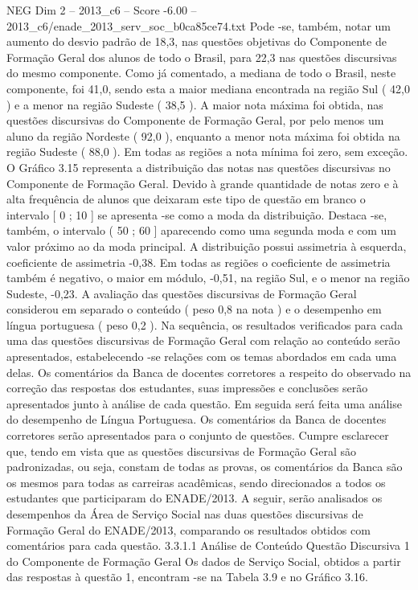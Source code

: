 \begin{textsample}{NEG Dim 2 – 2013\_c6 – Score -6.00 – 2013\_c6/enade\_2013\_serv\_soc\_b0ca85ce74.txt}
Pode -se, também, notar um aumento do desvio padrão de 18,3, nas questões objetivas do Componente de Formação Geral dos alunos de todo o Brasil, para 22,3 nas questões discursivas do mesmo componente.
Como já comentado, a mediana de todo o Brasil, neste componente, foi 41,0, sendo esta a maior mediana encontrada na região Sul ( 42,0 ) e a menor na região Sudeste ( 38,5 ).
A maior nota máxima foi obtida, nas questões discursivas do Componente de Formação Geral, por pelo menos um aluno da região Nordeste ( 92,0 ), enquanto a menor nota máxima foi obtida na região Sudeste ( 88,0 ).
Em todas as regiões a nota mínima foi zero, sem exceção.
O Gráfico 3.15 representa a distribuição das notas nas questões discursivas no Componente de Formação Geral.
Devido à grande quantidade de notas zero e à alta frequência de alunos que deixaram este tipo de questão em branco o intervalo [ 0 ; 10 ] se apresenta -se como a moda da distribuição.
Destaca -se, também, o intervalo ( 50 ; 60 ] aparecendo como uma segunda moda e com um valor próximo ao da moda principal.
A distribuição possui assimetria à esquerda, coeficiente de assimetria -0,38.
Em todas as regiões o coeficiente de assimetria também é negativo, o maior em módulo, -0,51, na região Sul, e o menor na região Sudeste, -0,23.
A avaliação das questões discursivas de Formação Geral considerou em separado o conteúdo ( peso 0,8 na nota ) e o desempenho em língua portuguesa ( peso 0,2 ).
Na sequência, os resultados verificados para cada uma das questões discursivas de Formação Geral com relação ao conteúdo serão apresentados, estabelecendo -se relações com os temas abordados em cada uma delas.
Os comentários da Banca de docentes corretores a respeito do observado na correção das respostas dos estudantes, suas impressões e conclusões serão apresentados junto à análise de cada questão.
Em seguida será feita uma análise do desempenho de Língua Portuguesa.
Os comentários da Banca de docentes corretores serão apresentados para o conjunto de questões.
Cumpre esclarecer que, tendo em vista que as questões discursivas de Formação Geral são padronizadas, ou seja, constam de todas as provas, os comentários da Banca são os mesmos para todas as carreiras acadêmicas, sendo direcionados a todos os estudantes que participaram do ENADE/2013.
A seguir, serão analisados os desempenhos da Área de Serviço Social nas duas questões discursivas de Formação Geral do ENADE/2013, comparando os resultados obtidos com comentários para cada questão. 3.3.1.1 Análise de Conteúdo Questão Discursiva 1 do Componente de Formação Geral Os dados de Serviço Social, obtidos a partir das respostas à questão 1, encontram -se na Tabela 3.9 e no Gráfico 3.16.

\end{textsample}
